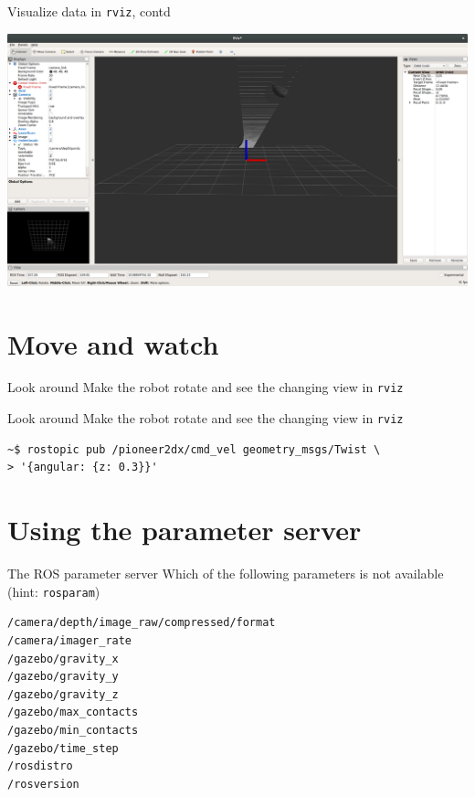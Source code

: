 \documentclass[presentation,aspectratio=1610]{beamer}
\begin{document}
\begin{frame}[fragile,label=sec-4-4]{Visualize data in \texttt{rviz}, contd}
 \begin{center}
\includegraphics[width=\linewidth]{rviz-view.png}
\end{center}
\end{frame}


\section{Move and watch}
\label{sec-5}

\begin{frame}[fragile,label=sec-5-1]{Look around}
 Make the robot rotate and see the changing view in \texttt{rviz}
\end{frame}

\begin{frame}[fragile,label=sec-5-2]{Look around}
 Make the robot rotate and see the changing view in \texttt{rviz}

\begin{verbatim}
~$ rostopic pub /pioneer2dx/cmd_vel geometry_msgs/Twist \
> '{angular: {z: 0.3}}'
\end{verbatim}
\end{frame}

\section{Using the parameter server}
\label{sec-6}

\begin{frame}[fragile,label=sec-6-1]{The ROS parameter server}
 Which of the following parameters is \alert{not} available (hint: \texttt{rosparam})

\begin{verbatim}
/camera/depth/image_raw/compressed/format
/camera/imager_rate
/gazebo/gravity_x
/gazebo/gravity_y
/gazebo/gravity_z
/gazebo/max_contacts
/gazebo/min_contacts
/gazebo/time_step
/rosdistro
/rosversion
\end{verbatim}
\end{frame}
\end{document}
